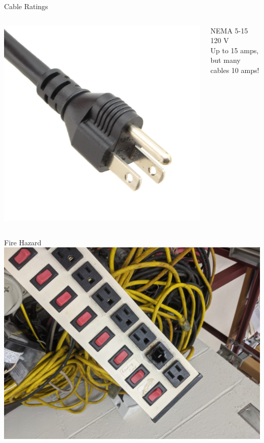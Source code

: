 \documentclass{presentation}
\begin{document}
\begin{frame}{Cable Ratings}
  \begin{columns}
    \begin{column}{0.33\textwidth}
      \includegraphics[width=\textwidth]{"./5-15.jpg"}
    \end{column}
    \begin{column}{0.67\textwidth}
      NEMA 5-15
      \\
      120 V
      \\
      Up to 15 amps, but many cables 10 amps!
    \end{column}
  \end{columns}
\end{frame}

\begin{frame}{Fire Hazard}
  \includegraphics[width=\textwidth]{"./PXL_20201216_221308084.jpg"}
\end{frame}
\end{document}
